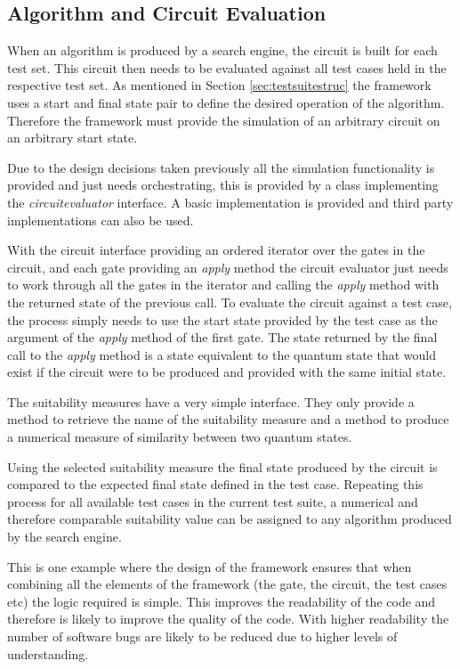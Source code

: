 \subsection{Algorithm and Circuit Evaluation}
\label{sec:cireval}
When an algorithm is produced by a search engine, the circuit is built for each test set.
This circuit then needs to be evaluated against all test cases held in the respective test set.
As mentioned in Section \ref{sec:testsuitestruc} the framework uses a start and final state pair to define the desired operation of the algorithm.
Therefore the framework must provide the simulation of an arbitrary circuit on an arbitrary start state.

Due to the design decisions taken previously all the simulation functionality is provided and just needs orchestrating, this is provided by a class implementing the \emph{circuitevaluator} interface.
A basic implementation is provided and third party implementations can also be used.

With the circuit interface providing an ordered iterator over the gates in the circuit, and each gate providing an \emph{apply} method the circuit evaluator just needs to work through all the gates in the iterator and calling the \emph{apply} method with the returned state of the previous call.
To evaluate the circuit against a test case, the process simply needs to use the start state provided by the test case as the argument of the \emph{apply} method of the first gate.
The state returned by the final call to the \emph{apply} method is a state equivalent to the quantum state that would exist if the circuit were to be produced and provided with the same initial state.

The suitability measures have a very simple interface.
They only provide a method to retrieve the name of the suitability measure and a method to produce a numerical measure of similarity between two quantum states.

Using the selected suitability measure the final state produced by the circuit is compared to the expected final state defined in the test case.
Repeating this process for all available test cases in the current test suite, a numerical and therefore comparable suitability value can be assigned to any algorithm produced by the search engine.

This is one example where the design of the framework ensures that when combining all the elements of the framework (the gate, the circuit, the test cases etc) the logic required is simple.
This improves the readability of the code and therefore is likely to improve the quality of the code.
With higher readability the number of software bugs are likely to be reduced due to higher levels of understanding.

